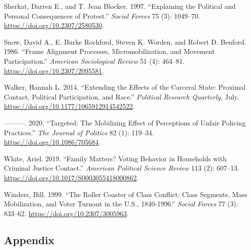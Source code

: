 \documentclass[
  12pt,
]{article}
\newlength{\cslhangindent}
\newenvironment{cslreferences}%
  {\setlength{\parindent}{0pt}%
  \everypar{\setlength{\hangindent}{\cslhangindent}}\ignorespaces}%
  {\par}
\begin{document}
\begin{cslreferences}
\leavevmode\hypertarget{ref-Sherkat1997}{}%
Sherkat, Darren E., and T. Jean Blocker. 1997. ``Explaining the Political and Personal Consequences of Protest.'' \emph{Social Forces} 75 (3): 1049--70. \url{https://doi.org/10.2307/2580530}.

\leavevmode\hypertarget{ref-Snow1986}{}%
Snow, David A., E. Burke Rochford, Steven K. Worden, and Robert D. Benford. 1986. ``Frame Alignment Processes, Micromobilization, and Movement Participation.'' \emph{American Sociological Review} 51 (4): 464--81. \url{https://doi.org/10.2307/2095581}.

\leavevmode\hypertarget{ref-Walker2014}{}%
Walker, Hannah L. 2014. ``Extending the Effects of the Carceral State: Proximal Contact, Political Participation, and Race.'' \emph{Political Research Quarterly}, July. \url{https://doi.org/10.1177/1065912914542522}.

\leavevmode\hypertarget{ref-Walker2020}{}%
---------. 2020. ``Targeted: The Mobilizing Effect of Perceptions of Unfair Policing Practices.'' \emph{The Journal of Politics} 82 (1): 119--34. \url{https://doi.org/10.1086/705684}.

\leavevmode\hypertarget{ref-White2019}{}%
White, Ariel. 2019. ``Family Matters? Voting Behavior in Households with Criminal Justice Contact.'' \emph{American Political Science Review} 113 (2): 607--13. \url{https://doi.org/10.1017/S0003055418000862}.

\leavevmode\hypertarget{ref-Winders1999}{}%
Winders, Bill. 1999. ``The Roller Coaster of Class Conflict: Class Segments, Mass Mobilization, and Voter Turnout in the U.S., 1840-1996.'' \emph{Social Forces} 77 (3): 833--62. \url{https://doi.org/10.2307/3005963}.
\end{cslreferences}

\newpage
{}

\hypertarget{appendix}{%
\subsection*{Appendix}\label{appendix}}
\end{document}
